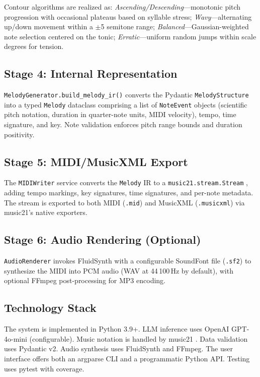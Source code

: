 \documentclass[conference]{IEEEtran}
\begin{document}
Contour algorithms are realized as: \textit{Ascending/Descending}---monotonic
pitch progression with occasional plateaus based on syllable stress;
\textit{Wavy}---alternating up/down movement within a $\pm$5 semitone range;
\textit{Balanced}---Gaussian-weighted note selection centered on the tonic;
\textit{Erratic}---uniform random jumps within scale degrees for tension.

\subsection{Stage 4: Internal Representation}

\texttt{MelodyGenerator.build\_melody\_ir()} converts the Pydantic
\texttt{MelodyStructure} into a typed \texttt{Melody} dataclass comprising a
list of \texttt{NoteEvent} objects (scientific pitch notation, duration in
quarter-note units, MIDI velocity), tempo, time signature, and key. Note
validation enforces pitch range bounds and duration positivity.

\subsection{Stage 5: MIDI/MusicXML Export}

The \texttt{MIDIWriter} service converts the \texttt{Melody} IR to a
\texttt{music21.stream.Stream} \cite{cuthbert2010}, adding tempo markings, key
signatures, time signatures, and per-note metadata. The stream is exported to
both MIDI (\texttt{.mid}) and MusicXML (\texttt{.musicxml}) via music21's
native exporters.

\subsection{Stage 6: Audio Rendering (Optional)}

\texttt{AudioRenderer} invokes FluidSynth with a configurable SoundFont file
(\texttt{.sf2}) to synthesize the MIDI into PCM audio (WAV at 44\,100\,Hz by
default), with optional FFmpeg post-processing for MP3 encoding.

\subsection{Technology Stack}

The system is implemented in Python 3.9+. LLM inference uses OpenAI
GPT-4o-mini \cite{openai2024} (configurable). Music notation is handled by
music21 \cite{cuthbert2010}. Data validation uses Pydantic v2. Audio synthesis
uses FluidSynth and FFmpeg. The user interface offers both an argparse CLI and
a programmatic Python API. Testing uses pytest with coverage.
\end{document}
